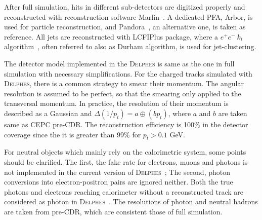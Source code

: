 \documentclass[a4paper,10pt,twoside]{cpc-hepnp}
\begin{document}
\begin{multicols}{2}

After full simulation,  hits in different sub-detectors are digitized properly
and reconstructed with reconstruction software  Marlin{~\cite{ref:marlin}}.
A dedicated PFA, Arbor\cite{ref:arbor},  is used for particle reconstruction, and Pandora{~\cite{ref:pandora}}, an alternative one,
is taken as reference. All jets are reconstructed with LCFIPlus package\cite{ref:lcfiplus},
where a $e^+e^-~k_t$ algorithm{~\cite{ref:eekt}},  often referred to also as {\sf Durham} algorithm,  is used for jet-clustering.

The detector model implemented in the {\textsc{Delphes}} is same as the one in full simulation with necessary simplifications.
For the charged tracks simulated with {\textsc{Delphes}}, there is a common strategy to smear their momentum.
The angular resolution is assumed to be perfect, so that the smearing only applied to the transversal momentum.
In practice, the resolution of their momentum is described as a Gaussian and  $\Delta(1/p_t)=a \oplus (b p_t) $,
where $a$ and $b$ are taken same as CEPC pre-CDR.
The reconstruction efficiency is 100\% in the detector coverage since the it is greater than 99\% for $p_t>0.1$ GeV.


For neutral objects which mainly rely on the calorimetric system, some points should be clarified.
The first, the fake rate for electrons, muons and photons is not implemented in the current version of {\textsc{Delphes}~};
The second, photon conversions into electron-positron pairs are ignored neither.
Both the true photons and electrons reaching calorimeter without a reconstructed track are considered as photon in {\textsc{Delphes}~}.
The resolutions of photon and neutral hadrons are taken from pre-CDR, which are consistent those of full simulation.


\end{multicols}
\end{document}
